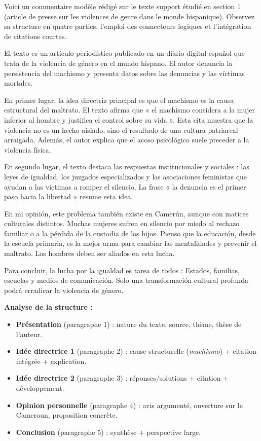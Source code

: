 \documentclass[11pt]{article}
\begin{document}
Voici un commentaire modèle rédigé sur le texte support étudié en section 1 (article de presse sur les violences de genre dans le monde hispanique). Observez sa structure en quatre parties, l'emploi des connecteurs logiques et l'intégration de citations courtes.

\begin{textebox}
El texto es un artículo periodístico publicado en un diario digital español que trata de la violencia de género en el mundo hispano. El autor denuncia la persistencia del machismo y presenta datos sobre las denuncias y las víctimas mortales.

En primer lugar, la idea directriz principal es que el machismo es la causa estructural del maltrato. El texto afirma que « el machismo considera a la mujer inferior al hombre y justifica el control sobre su vida ». Esta cita muestra que la violencia no es un hecho aislado, sino el resultado de una cultura patriarcal arraigada. Además, el autor explica que el acoso psicológico suele preceder a la violencia física.

En segundo lugar, el texto destaca las respuestas institucionales y sociales : las leyes de igualdad, los juzgados especializados y las asociaciones feministas que ayudan a las víctimas a romper el silencio. La frase « la denuncia es el primer paso hacia la libertad » resume esta idea.

En mi opinión, este problema también existe en Camerún, aunque con matices culturales distintos. Muchas mujeres sufren en silencio por miedo al rechazo familiar o a la pérdida de la custodia de los hijos. Pienso que la educación, desde la escuela primaria, es la mejor arma para cambiar las mentalidades y prevenir el maltrato. Los hombres deben ser aliados en esta lucha.

Para concluir, la lucha por la igualdad es tarea de todos : Estados, familias, escuelas y medios de comunicación. Solo una transformación cultural profunda podrá erradicar la violencia de género.
\end{textebox}

\noindent\textbf{Analyse de la structure :}
\begin{itemize}
  \item \textbf{Présentation} (paragraphe 1) : nature du texte, source, thème, thèse de l'auteur.
  \item \textbf{Idée directrice 1} (paragraphe 2) : cause structurelle (\emph{machismo}) + citation intégrée + explication.
  \item \textbf{Idée directrice 2} (paragraphe 3) : réponses/solutions + citation + développement.
  \item \textbf{Opinion personnelle} (paragraphe 4) : avis argumenté, ouverture sur le Cameroun, proposition concrète.
  \item \textbf{Conclusion} (paragraphe 5) : synthèse + perspective large.
\end{itemize}
\end{document}
